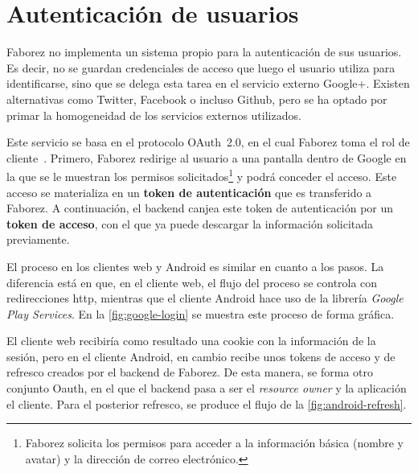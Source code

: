 \documentclass[main]{subfiles}
\begin{document}


\section{Autenticación de usuarios}
\label{sec:arquitectura-autenticación}

Faborez no implementa un sistema propio para la autenticación de sus usuarios. Es decir, no se guardan credenciales de acceso que luego el usuario utiliza para identificarse, sino que se delega esta tarea en el servicio externo Google+. Existen alternativas como Twitter, Facebook o incluso Github, pero se ha optado por primar la homogeneidad de los servicios externos utilizados.

Este servicio se basa en el protocolo OAuth~2.0, en el cual Faborez toma el rol de cliente~\autocite[sec.~1.1]{oauthrfc}. Primero, Faborez redirige al usuario a una pantalla dentro de Google en la que se le muestran los permisos solicitados\footnote{Faborez solicita los permisos para acceder a la información básica (nombre y avatar) y la dirección de correo electrónico.} y podrá conceder el acceso. Este acceso se materializa en un \textbf{\gls{token} de autenticación} que es transferido a Faborez. A continuación, el \gls{backend} canjea este \gls{token} de autenticación por un \textbf{\gls{token} de acceso}, con el que ya puede descargar la información solicitada previamente.

El proceso en los clientes web y Android es similar en cuanto a los pasos. La diferencia está en que, en el cliente web, el flujo del proceso se controla con redirecciones \gls{http}, mientras que el cliente Android hace uso de la librería \emph{Google Play Services}. En la \cref{fig:google-login} se muestra este proceso de forma gráfica.



El cliente web recibiría como resultado una \gls{cookie} con la información de la sesión, pero en el cliente Android, en cambio recibe unos \glspl{token} de acceso y de refresco creados por el \gls{backend} de Faborez. De esta manera, se forma otro conjunto Oauth, en el que el \gls{backend} pasa a ser el \emph{resource owner} y la aplicación el cliente. Para el posterior refresco, se produce el flujo de la \cref{fig:android-refresh}.


\end{document}
